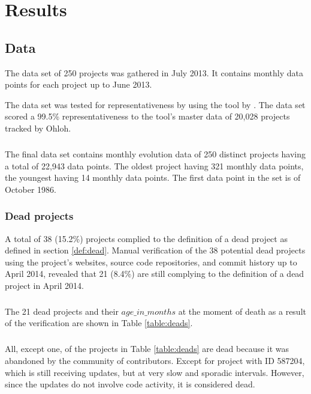 \chapter{Results}
\label{results}

\section{Data}
The data set of 250 projects was gathered in July 2013. It contains monthly
data points for each project up to June 2013.

The data set was tested for representativeness by using the tool by
\citet{nagappan}. The data set scored a 99.5\% representativeness to the tool's
master data of 20,028 projects tracked by Ohloh.

\paragraph{}
The final data set contains monthly evolution data of 250 distinct projects
having a total of 22,943 data points. The oldest project having 321 monthly
data points, the youngest having 14 monthly data points. The first data point
in the set is of October 1986.

\subsection{Dead projects}
\label{section:deads}
A total of 38 (15.2\%) projects complied to the definition of a dead project as
defined in section \ref{def:dead}. Manual verification of the 38 potential
dead projects using the project's websites, source code repositories, and
commit history up to April 2014, revealed that 21 (8.4\%) are still complying
to the definition of a dead project in April 2014.

\paragraph{}
The 21 dead projects and their $age\_in\_months$ at the moment of death as a
result of the verification are shown in Table \ref{table:deads}.



\paragraph{}
All, except one, of the projects in Table \ref{table:deads} are dead because it
was abandoned by the community of contributors. Except for project with ID
587204, which is still receiving updates, but at very slow and sporadic
intervals. However, since the updates do not involve code activity, it is
considered dead.

